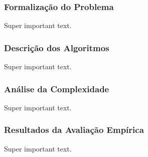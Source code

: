 \documentclass{beamer}
\begin{document}
\begin{frame}
  \frametitle{Formalização do Problema}
  Super important text.
\end{frame}

\begin{frame}
  \frametitle{Descrição dos Algoritmos}
  Super important text.
\end{frame}

\begin{frame}
  \frametitle{Análise da Complexidade}
  Super important text.
\end{frame}

\begin{frame}
  \frametitle{Resultados da Avaliação Empírica}
  Super important text.
\end{frame}


\end{document}
